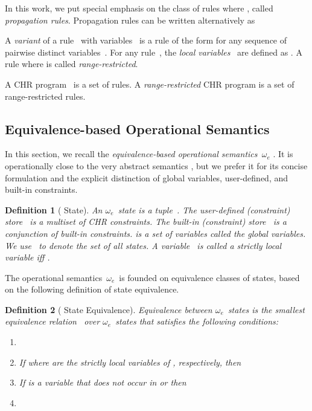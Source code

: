 \documentclass{tlp}
\newtheorem{definition}{Definition}[section]
\newcommand{\oesq}{\ensuremath{{\omega_e}}}
\begin{document}
In this work, we put special emphasis on the class of rules where , called \emph{propagation rules}. Propagation rules can be written
alternatively as 

A \emph{variant} of a rule~ with variables~ is a rule of the form  for any sequence of pairwise
distinct variables~. For any rule~, the \emph{local variables}~ are
defined as . A rule where
 is called \emph{range-restricted}.

A CHR program~ is a set of rules. A \emph{range-restricted} CHR program is
a set of range-restricted rules.

\subsection{Equivalence-based Operational Semantics }

In this section, we recall the \emph{equivalence-based operational
semantics~\oesq} \cite{Raiser2009a}. It is operationally close to the very
abstract semantics , but we prefer it for its concise formulation
and the explicit distinction of global variables, user-defined, and built-in
constraints.

\begin{definition}[ State]\label{def:m_state}
An {\em \oesq\ state} is a tuple~. The \emph{user-defined
(constraint) store}~ is a multiset of CHR constraints. The {\em built-in
(constraint) store}~ is a conjunction of built-in constraints.  is a set
of variables called the \emph{global variables}. We use~ to denote the set
of all  states. A variable~ is called a \emph{strictly local
variable} iff .
\end{definition}

The operational semantics~\oesq\ is founded on equivalence classes of
states, based on the following definition of state equivalence.

\begin{definition}[ State Equivalence]
\label{def:m:equiv}
Equivalence between \oesq~states is the smallest equivalence relation~
over \oesq~states that satisfies the following conditions:

\begin{enumerate}
\item \label{cond:m:subst}

\item \label{cond:m:ct} If
 where  are the strictly local variables of , respectively, then 
\item \label{cond:m:global} 
If  is a variable that does not occur in  or  then

\item \label{cond:m:fail}

\end{enumerate}
\end{definition}
\end{document}
